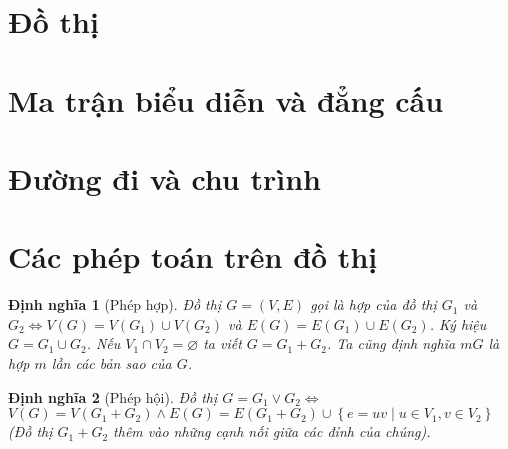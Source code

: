 \documentclass[14pt]{extarticle}
\newtheorem{definition}{Định nghĩa}[section]
\begin{document}
\tableofcontents\pagebreak


\section{Đồ thị}
% 

\section{Ma trận biểu diễn và đẳng cấu}
% 

\section{Đường đi và chu trình}
% 

\section{Các phép toán trên đồ thị}
\label{sec:cac_phep_toan_tren_do_thi}
\begin{definition}
	[Phép hợp] Đồ thị $G = (V,E)$ gọi là hợp của đồ thị $G_1$ và $G_2 \iff V(G) = V(G_1) \cup V(G_2)$ và $E(G) = E(G_1) \cup E(G_2)$. Ký hiệu $G = G_1\cup G_2$. Nếu $V_1 \cap V_2 = \varnothing$ ta viết $G = G_1 + G_2$. Ta cũng định nghĩa $mG$ là hợp $m$ lần các bản sao của $G$.
\end{definition}
\begin{definition}
	[Phép hội] Đồ thị $G = G_1 \lor G_2 \iff$ $V(G) = V(G_1 + G_2) \land E(G) = E(G_1 +G_2) \cup \left\{e=uv\mid u \in V_1, v \in V_2\right\}$ (Đồ thị $G_1 +G_2$ thêm vào những cạnh nối giữa các đỉnh của chúng).
\end{definition}
\end{document}
